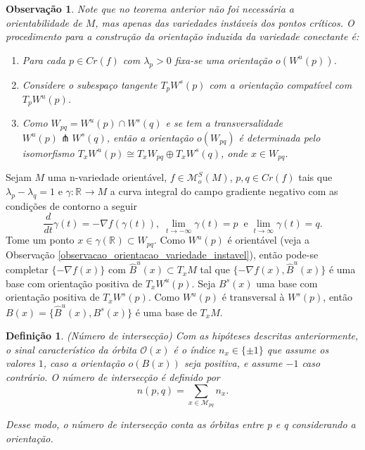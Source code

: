 \documentclass[12pt]{book}
\newtheorem{definicao}[teorema]{Definição}
\newtheorem{observacao}[teorema]{Observação}
\newcommand{\derivada}[2]{\frac{d #1}{d #2}}
\newcommand{\espacomoduli}[2]{\mathcal{M}_{#1#2}}
\newcommand{\espacotangenteponto}[2]{T_{#1}#2}
\newcommand{\funcoesmorsesmale}[1]{\mathcal{M}^{S}_{o}(#1)}
\newcommand{\gradiente}{\nabla f}
\newcommand{\orbitaponto}[1]{\mathcal{O}(#1)}
\newcommand{\pontoscriticos}[1]{\textit{Cr}(#1)}
\newcommand{\real}[1]{\mathbb{R}^{#1}}
\newcommand{\reta}{\real{}}
\newcommand{\variedadeconectantepontos}[2]{W_{#1#2}}
\newcommand{\variedadeestavel}[1]{W^{s}(#1)}
\newcommand{\variedadeinstavel}[1]{W^{u}(#1)}
\begin{document}
	\begin{observacao}
		Note que no teorema anterior não foi necessária a orientabilidade de $M$, mas apenas das variedades instáveis dos pontos críticos. O procedimento para a construção da orientação induzida da variedade conectante é:
		\begin{enumerate}
			\item Para cada $p\in \pontoscriticos{f}$ com $\lambda_{p}>0$ fixa-se uma orientação $o(\variedadeinstavel{p})$.
			
			\item Considere o subespaço tangente $\espacotangenteponto{p}{\variedadeestavel{p}}$ com a orientação compatível com $\espacotangenteponto{p}{\variedadeinstavel{p}}$.
			
			\item Como $\variedadeconectantepontos{p}{q} = \variedadeinstavel{p}\cap\variedadeestavel{q}$ e se tem a transversalidade $\variedadeinstavel{p}\pitchfork\variedadeestavel{q}$, então a orientação $o(\variedadeconectantepontos{p}{q})$ é determinada pelo isomorfismo $\espacotangenteponto{x}{\variedadeinstavel{p}}\cong \espacotangenteponto{x}{\variedadeconectantepontos{p}{q}}\oplus \espacotangenteponto{x}{\variedadeestavel{q}}$, onde $x \in \variedadeconectantepontos{p}{q}$.
		\end{enumerate}
	\end{observacao}

	Sejam $M$ uma n-variedade orientável, $f \in \funcoesmorsesmale{M}$, $p,q\in \pontoscriticos{f}$ tais que $\lambda_{p}-\lambda_{q} = 1$ e $\gamma :\reta \to M$ a curva integral do campo gradiente negativo com as condições de contorno a seguir
	$$
	\derivada{}{t}\gamma(t) = -\gradiente(\gamma(t)), \; \lim_{t \to -\infty}\gamma(t) = p\;\;\text{e}\; \lim_{t \to \infty}\gamma(t) = q.
	$$
	Tome um ponto $x \in \gamma(\reta) \subset \variedadeconectantepontos{p}{q}$. Como $\variedadeinstavel{p}$ é orientável (veja a Observação \ref{observacao_orientacao_variedade_instavel}), então pode-se completar $\{-\gradiente(x)\}$ com $\hat{B}^{u}(x) \subset \espacotangenteponto{x}{M}$ tal que $\{-\gradiente(x), \hat{B}^{u}(x)\}$ é uma base com orientação positiva de $\espacotangenteponto{x}{\variedadeinstavel{p}}$. Seja $B^{s}(x)$ uma base com orientação positiva de $\espacotangenteponto{x}{\variedadeestavel{p}}$.  Como $\variedadeinstavel{p}$ é transversal à $\variedadeestavel{p}$, então $B(x)=\{ \hat{B}^{u}(x), B^{s}(x)\}$ é uma base de $\espacotangenteponto{x}{M}$.
	
	\begin{definicao}
		(Número de intersecção) Com as hipóteses descritas anteriormente, o sinal característico da órbita $\orbitaponto{x}$ é o índice $n_{x} \in \{\pm 1\}$ que assume os valores $1$, caso a orientação $o(B(x))$ seja positiva, e assume $-1$ caso contrário. O número de intersecção é definido por 
		$$
		n(p,q) = \sum_{x \in \espacomoduli{p}{q} }n_{x}.
		$$
		
		Desse modo, o número de intersecção conta as órbitas entre p e q considerando a orientação.
	\end{definicao}
	
\end{document}
